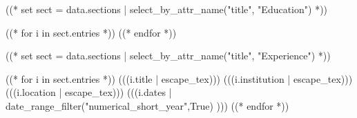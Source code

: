 \documentclass[10pt, letterpaper]{awesome-cv}
\begin{document}
\makecvheader

\makecvfooter
  {}
  {}
  {}



((* set sect = data.sections | select_by_attr_name("title", "Education") *))
\begin{cvhonors}
((* for i in sect.entries *))
((* endfor *))
\end{cvhonors}

((* set sect = data.sections | select_by_attr_name("title", "Experience") *))
\begin{cvhonors}
((* for i in sect.entries *))
\cvhonor
  {(((i.title | escape_tex)))}
  {(((i.institution | escape_tex)))}
  {(((i.location | escape_tex)))}
  {(((i.dates | date_range_filter("numerical_short_year",True) )))}
((* endfor *))
\end{cvhonors}

\end{document}
